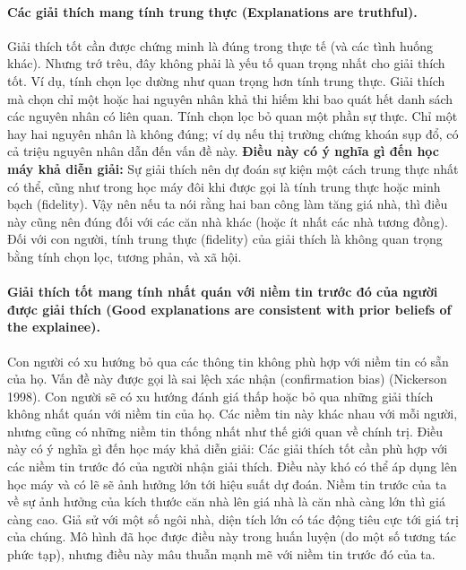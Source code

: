 \paragraph{Các giải thích mang tính trung thực (Explanations are truthful).} Giải thích tốt cần được chứng minh là đúng trong thực tế (và các tình huống khác). Nhưng trớ trêu, đây không phải là yếu tố quan trọng nhất cho giải thích tốt. Ví dụ, tính chọn lọc dường như quan trọng hơn tính trung thực. Giải thích mà chọn chỉ một hoặc hai nguyên nhân khả thi hiếm khi bao quát hết danh sách các nguyên nhân có liên quan. Tính chọn lọc bỏ quan một phần sự thực. Chỉ một hay hai nguyên nhân là không đúng; ví dụ nếu thị trường chứng khoán sụp đổ, có cả triệu nguyên nhân dẫn đến vấn đề này.
\textbf{Điều này có ý nghĩa gì đến học máy khả diễn giải:} Sự giải thích nên dự đoán sự kiện một cách trung thực nhất có thể, cũng như trong học máy đôi khi được gọi là tính trung thực hoặc minh bạch (fidelity). Vậy nên nếu ta nói rằng hai ban công làm tăng giá nhà, thì điều này cũng nên đúng đối với các căn nhà khác (hoặc ít nhất các nhà tương đồng). Đối với con người, tính trung thực (fidelity) của giải thích là không quan trọng bằng tính chọn lọc, tương phản, và xã hội. 

\paragraph{Giải thích tốt mang tính nhất quán với niềm tin trước đó của người được giải thích (Good explanations are consistent with prior beliefs of the explainee).} Con người có xu hướng bỏ qua các thông tin không phù hợp với niềm tin có sẵn của họ. Vấn đề này được gọi là sai lệch xác nhận (confirmation bias) (Nickerson 1998). Con người sẽ có xu hướng đánh giá thấp hoặc bỏ qua những giải thích không nhất quán với niềm tin của họ. Các niềm tin này khác nhau với mỗi người, nhưng cũng có những niềm tin thống nhất như thế giới quan về chính trị.
\textbf{}{Điều này có ý nghĩa gì đến học máy khả diễn giải:} Các giải thích tốt cần phù hợp với các niềm tin trước đó của người nhận giải thích. Điều này khó có thể áp dụng lên học máy và có lẽ sẽ ảnh hưởng lớn tới hiệu suất dự đoán. Niềm tin trước của ta về sự ảnh hưởng của kích thước căn nhà lên giá nhà là căn nhà càng lớn thì giá càng cao. Giả sử với một số ngôi nhà, diện tích lớn có tác động tiêu cực tới giá trị của chúng. Mô hình đã học được điều này trong huấn luyện (do một số tương tác phức tạp), nhưng điều này mâu thuẫn mạnh mẽ với niềm tin trước đó của ta.

